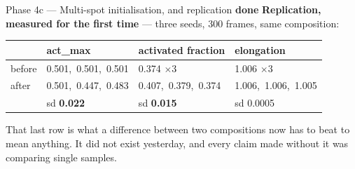 \documentclass[11pt,a4paper]{article}
\newcommand{\dn}{\textcolor{good}{\textbf{done}}}
\begin{document}
\begin{phasebox}{Phase 4c --- Multi-spot initialisation, and replication \hfill \dn}
\textbf{Replication, measured for the first time} --- three seeds, 300 frames, same composition:

\begin{center}\small
\begin{tabular}{@{}l l l l@{}}
\toprule
& \textbf{act\_max} & \textbf{activated fraction} & \textbf{elongation}\\
\midrule
before & 0.501,\ 0.501,\ 0.501 & 0.374 $\times$3 & 1.006 $\times$3\\
after  & 0.501,\ 0.447,\ 0.483 & 0.407,\ 0.379,\ 0.374 & 1.006,\ 1.006,\ 1.005\\
\midrule
       & sd \textbf{0.022} & sd \textbf{0.015} & sd 0.0005\\
\bottomrule
\end{tabular}
\end{center}

That last row is what a difference between two compositions now has to beat to mean anything. It
did not exist yesterday, and every claim made without it was comparing single samples.
\end{phasebox}
\end{document}

